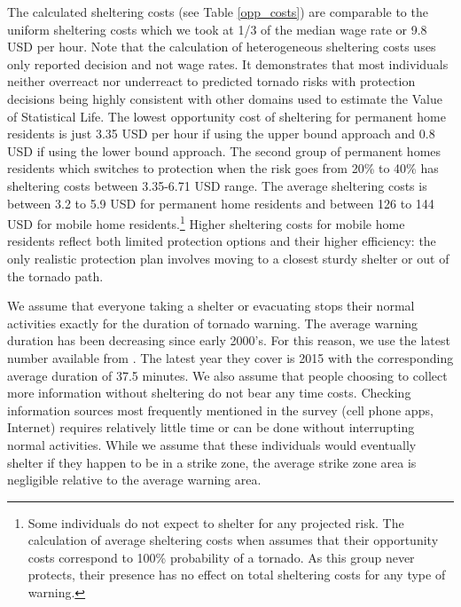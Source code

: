 \documentclass{ametsocV6.1}
\begin{document}


The calculated sheltering costs (see Table \ref{opp_costs}) are comparable to the uniform sheltering costs which we took at 1/3 of the median wage rate or 9.8 USD per hour. Note that the calculation of heterogeneous sheltering costs uses only reported decision and not wage rates. It demonstrates that most individuals neither overreact nor underreact to predicted tornado risks with protection decisions being highly consistent with other domains used to estimate the Value of Statistical Life. The lowest opportunity cost of sheltering for permanent home residents is just 3.35 USD per hour if using the upper bound approach and 0.8 USD if using the lower bound approach. The second group of permanent homes residents which switches to protection when the risk goes from 20\% to 40\% has sheltering costs between 3.35-6.71 USD range. The average sheltering costs is between 3.2 to 5.9 USD for permanent home residents and between 126 to 144 USD for mobile home residents.\footnote{Some individuals do not expect to shelter for any projected risk. The calculation of average sheltering costs when assumes that their opportunity costs correspond to 100\% probability of a tornado. As this group never protects, their presence has no effect on total sheltering costs for any type of warning.} Higher sheltering costs for mobile home residents reflect both limited protection options and their higher efficiency: the only realistic protection plan involves moving to a closest sturdy shelter or out of the tornado path. 

We assume that everyone taking a shelter or evacuating stops their normal activities exactly for the duration of tornado warning. The average warning duration has been decreasing since early 2000’s. For this reason, we use the latest number available from \citet{brooks_long-term_2018}. The latest year they cover is 2015 with the corresponding average duration of 37.5 minutes. We also assume that people choosing to collect more information without sheltering do not bear any time costs. Checking information sources most frequently mentioned in the survey (cell phone apps, Internet) requires relatively little time or can be done without interrupting normal activities. While we assume that these individuals would eventually shelter if they happen to be in a strike zone, the average strike zone area is negligible relative to the average warning area.



\vspace{20pt}
\end{document}
